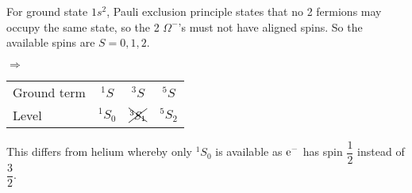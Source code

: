 \begin{parts}
	For ground state $1s^2$, Pauli exclusion principle states that no 2 fermions may occupy the same state, so the 2 $\Omega^-$'s must not have aligned spins.
	So the available spins are $S=0, 1, 2$.
	
	$\Rightarrow$
	\begin{tabular}{l c c c}
		Ground term & ${}^1 S$ & ${}^3 S$ & ${}^5 S$ \\
		Level & ${}^1 S_0$ & $\bcancel{\cancel{{}^3 S_1}}$ & ${}^5 S_2$
	\end{tabular}
	
	This differs from helium whereby only ${}^1 S_0$ is available as $\mathrm{e}^{-}$ has spin $\dfrac{1}{2}$ instead of $\dfrac{3}{2}$.
\end{parts}